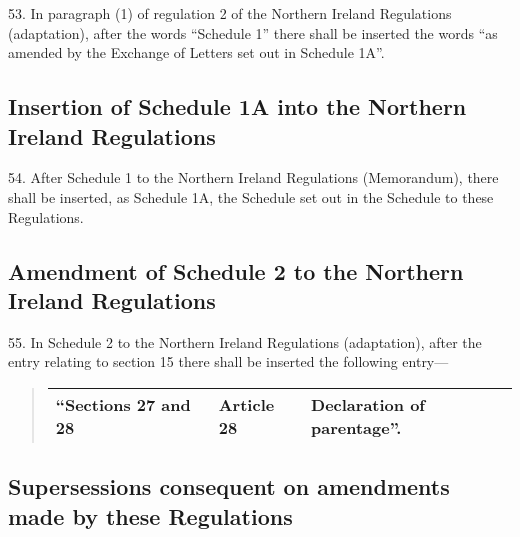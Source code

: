 \documentclass[12pt,a4paper]{article}
\begin{document}
53.  In paragraph (1) of regulation 2 of the Northern Ireland Regulations (adaptation), after the words “Schedule 1” there shall be inserted the words “as amended by the Exchange of Letters set out in Schedule 1A”.

\subsection[54. Insertion of Schedule 1A into the Northern Ireland Regulations]{Insertion of Schedule 1A into the Northern Ireland Regulations}

54.  After Schedule 1 to the Northern Ireland Regulations (Memorandum), there shall be inserted, as Schedule 1A, the Schedule set out in the Schedule to these Regulations.

\subsection[55. Amendment of Schedule 2 to the Northern Ireland Regulations]{Amendment of Schedule 2 to the Northern Ireland Regulations}

55.  In Schedule 2 to the Northern Ireland Regulations (adaptation), after the entry relating to section 15 there shall be inserted the following entry—
\begin{quotation}
\noindent
\begin{tabular}{lll}
\hline
“Sections 27 and 28 & Article 28 & Declaration of parentage”.\\
\hline
\end{tabular}
\end{quotation}

%

\subsection[56. Supersessions consequent on amendments made by these Regulations]{Supersessions consequent on amendments made by these Regulations}
\end{document}
